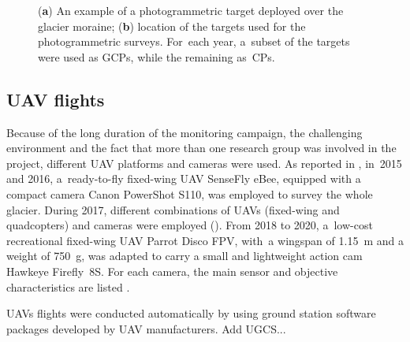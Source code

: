 \begin{figure}
    \centering
    \caption{(\textbf{a}) An example of a photogrammetric target deployed over the
        glacier moraine; (\textbf{b}) location of the targets used for the
        photogrammetric
        surveys. For~each year, a~subset of the targets were used as GCPs, while the
        remaining
        as~CPs.}
    \label{fig:3:belvedereGCP}
\end{figure}


\subsection{UAV flights}\label{sec:3:uav-flights}

Because of the long duration of the monitoring campaign, the challenging environment and
the fact that more than one research group was involved in the project, different UAV
platforms and cameras were used.
As reported in , in~2015 and 2016, a~ready-to-fly fixed-wing UAV
SenseFly eBee, equipped with a compact camera Canon PowerShot S110, was employed to
survey the whole glacier.
During 2017, different combinations of UAVs (fixed-wing and quadcopters) and cameras were
employed ().
From 2018 to 2020, a~low-cost recreational fixed-wing UAV Parrot Disco FPV, with~a
wingspan of \SI{1.15}{\meter} and a weight of \SI{750}{\gram}, was adapted to carry a
small and lightweight action cam Hawkeye Firefly~8S.
For each camera, the main sensor and objective characteristics are listed
.

UAVs flights were conducted automatically by using ground station software packages
developed by UAV manufacturers.
    {\color{red} Add UGCS...}

